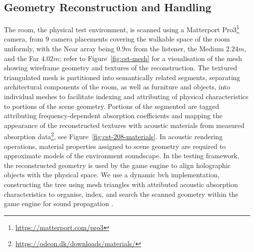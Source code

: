 \subsection{Geometry Reconstruction and Handling}
The room, the physical test environment, is scanned using a Matterport Pro3\footnote{\url{https://matterport.com/pro3}} camera, from 9 camera placements covering the walkable space of the room uniformly, with the Near array being $0.9m$ from the listener, the Medium $2.24m$, and the Far $4.02m$;  refer to Figure~\ref{fig:cst-mesh} for a visualisation of the mesh showing wireframe geometry and textures of the reconstruction. The textured triangulated mesh is partitioned into semantically related segments, separating architectural components of the room, as well as furniture and objects, into individual meshes to facilitate indexing and attributing of physical characteristics to portions of the scene geometry. Portions of the segmented are tagged attributing frequency-dependent absorption coefficients and mapping the appearance of the reconstructed textures with acoustic materials from measured absorption data\footnote{\url{https://odeon.dk/downloads/materials/}}, see Figure~\ref{fig:cst-208-materials}. In acoustic rendering operations, material properties assigned to scene geometry are required to approximate models of the environment soundscape. 
In the testing framework, the reconstructed geometry is used by the game engine to align holographic objects with the physical space. We use a dynamic \acrshort{bvh} implementation, constructing the tree using mesh triangles with attributed acoustic absorption characteristics to organise, index, and search the scanned geometry within the game engine for sound propagation \citep{kopta2012fast}.\par


